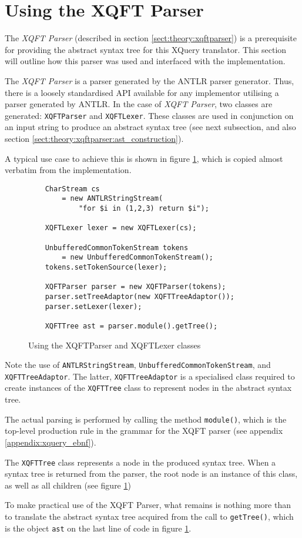 \section{Using the XQFT Parser}
The \textit{XQFT Parser}\cite{ourselves} (described in section
\ref{sect:theory:xqftparser}) is a prerequisite for providing the abstract
syntax tree for this XQuery translator. This section will outline how this
parser was used and interfaced with the implementation.

The \textit{XQFT Parser} is a parser generated by the ANTLR parser generator.
Thus, there is a loosely standardised API available for any implementor
utilising a parser generated by ANTLR. In the case of \textit{XQFT Parser}, two
classes are generated: \texttt{XQFTParser} and \texttt{XQFTLexer}. These
classes are used in conjunction on an input string to produce an abstract syntax
tree (see next subsection, and also section
\ref{sect:theory:xqftparser:ast_construction}).

A typical use case to achieve this is shown in figure
\ref{figure:impl:using_xqft}, which is copied almost verbatim from the
implementation.

\begin{figure}[!htp]
\begin{center}
  \begin{Verbatim}
    CharStream cs 
        = new ANTLRStringStream(
            "for $i in (1,2,3) return $i");

    XQFTLexer lexer = new XQFTLexer(cs);

    UnbufferedCommonTokenStream tokens 
        = new UnbufferedCommonTokenStream();
	tokens.setTokenSource(lexer);

    XQFTParser parser = new XQFTParser(tokens);
    parser.setTreeAdaptor(new XQFTTreeAdaptor());
    parser.setLexer(lexer);

    XQFTTree ast = parser.module().getTree();
  \end{Verbatim}
  \caption{Using the XQFTParser and XQFTLexer classes}
  \label{figure:impl:using_xqft}
\end{center}
\end{figure}
Note the use of \texttt{ANTLRStringStream},
\texttt{UnbufferedCommonTokenStream}, and \texttt{XQFTTreeAdaptor}. The latter,
\texttt{XQFTTreeAdaptor} is a specialised class required to create instances of
the \texttt{XQFTTree} class to represent nodes in the abstract syntax tree.

The actual parsing is performed by calling the method \texttt{module()}, which
is the top-level production rule in the grammar for the XQFT parser (see
appendix \ref{appendix:xquery_ebnf}).

The \texttt{XQFTTree} class represents a node in the produced syntax tree. When
a syntax tree is returned from the parser, the root node is an instance of this
class, as well as all children (see figure \ref{figure:impl:using_xqft})

To make practical use of the XQFT Parser, what remains is nothing more than to
translate the abstract syntax tree acquired from the call to
\texttt{getTree()}, which is the object \texttt{ast} on the last line of code
in figure \ref{figure:impl:using_xqft}.
